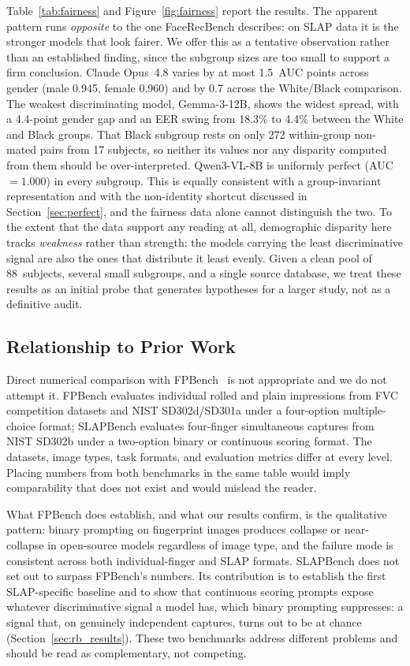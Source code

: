 \documentclass[journal]{IEEEtran}
\begin{document}
Table~\ref{tab:fairness} and Figure~\ref{fig:fairness} report the results.
The apparent pattern runs \emph{opposite} to the one FaceRecBench
describes: on SLAP data it is the stronger models that look fairer. We
offer this as a tentative observation rather than an established finding,
since the subgroup sizes are too small to support a firm conclusion.
Claude Opus~4.8 varies by at most 1.5~AUC points across gender
(male 0.945, female 0.960) and by 0.7 across the White/Black comparison.
The weakest discriminating model, Gemma-3-12B, shows the widest spread,
with a 4.4-point gender gap and an EER swing from 18.3\% to 4.4\% between
the White and Black groups. That Black subgroup rests on only 272
within-group non-mated pairs from 17 subjects, so neither its values nor
any disparity computed from them should be over-interpreted.
Qwen3-VL-8B is uniformly perfect (AUC~$= 1.000$) in every subgroup. This is
equally consistent with a group-invariant representation and with the
non-identity shortcut discussed in Section~\ref{sec:perfect}, and the
fairness data alone cannot distinguish the two.
To the extent that the data support any reading at all, demographic
disparity here tracks \emph{weakness} rather than strength: the models
carrying the least discriminative signal are also the ones that distribute
it least evenly.
Given a clean pool of 88~subjects, several small subgroups, and a single
source database, we treat these results as an initial probe that generates
hypotheses for a larger study, not as a definitive audit.

\subsection{Relationship to Prior Work}

Direct numerical comparison with FPBench~\cite{fpbench2025} is not
appropriate and we do not attempt it.
FPBench evaluates individual rolled and plain impressions from FVC
competition datasets and NIST SD302d/SD301a under a four-option
multiple-choice format; SLAPBench evaluates four-finger simultaneous
captures from NIST SD302b under a two-option binary or continuous
scoring format.
The datasets, image types, task formats, and evaluation metrics differ
at every level.
Placing numbers from both benchmarks in the same table would imply
comparability that does not exist and would mislead the reader.

What FPBench does establish, and what our results confirm, is the
qualitative pattern: binary prompting on fingerprint images produces
collapse or near-collapse in open-source models regardless of image
type, and the failure mode is consistent across both individual-finger
and SLAP formats.
SLAPBench does not set out to surpass FPBench's numbers. Its contribution
is to establish the first SLAP-specific baseline and to show that continuous
scoring prompts expose whatever discriminative signal a model has, which binary
prompting suppresses: a signal that, on genuinely independent captures, turns
out to be at chance (Section~\ref{sec:rb_results}).
These two benchmarks address different problems and should be read
as complementary, not competing.
\end{document}
